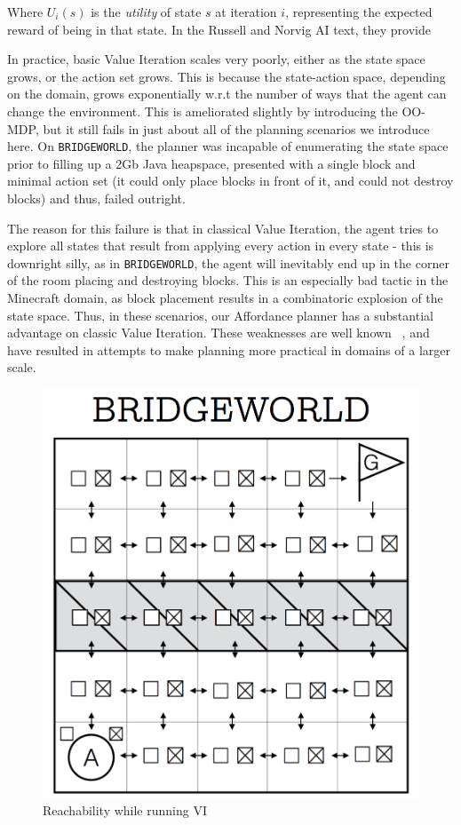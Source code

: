 \documentclass[]{article}
\begin{document}
Where $U_i(s)$ is the {\it utility} of state $s$ at iteration $i$, representing the expected reward of being in that state. In the Russell and Norvig AI text, they provide

In practice, basic Value Iteration scales very poorly, either as the state space grows, or the action set grows. This is because the state-action space, depending on the domain, grows exponentially w.r.t the number of ways that the agent can change the environment. This is ameliorated slightly by introducing the OO-MDP, but it still fails in just about all of the planning scenarios we introduce here. On \texttt{BRIDGEWORLD}, the planner was incapable of enumerating the state space prior to filling up a 2Gb Java heapspace, presented with a single block and minimal action set (it could only place blocks in front of it, and could not destroy blocks) and thus, failed outright.

The reason for this failure is that in classical Value Iteration, the agent tries to explore all states that result from applying every action in every state - this is downright silly, as in \texttt{BRIDGEWORLD}, the agent will inevitably end up in the corner of the room placing and destroying blocks. This is an especially bad tactic in the Minecraft domain, as block placement results in a combinatoric explosion of the state space. Thus, in these scenarios, our Affordance planner has a substantial advantage on classic Value Iteration. These weaknesses are well known ~\citep{grounds}, and have resulted in attempts to make planning more practical in domains of a larger scale.


\begin{figure}
\centering
\includegraphics[scale = 0.2]{figures/bridgeworld_vi.png}
\caption{Reachability while running VI}
\end{figure}
\end{document}
